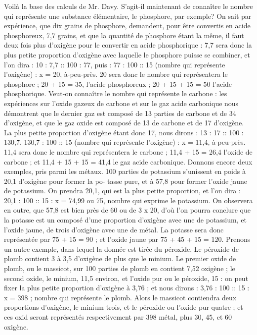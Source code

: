 Voilà la base des calculs de Mr. Davy. S'agit-il maintenant de connaître le nombre qui représente une substance élémentaire, le phosphore, par exemple? On sait par expérience, que dix grains de phosphore, demandent, pour être convertis en acide phosphoreux, 7,7 grains, et que la quantité de phosphore étant la même, il faut deux fois plus d'oxigène pour le convertir en acide\setcounter{page}{453} phosphorique : 7,7 sera donc la plus petite proportion d'oxigène avec laquelle le phosphore puisse se combiner, et l'on dira : 10 : 7,7 :: 100 : 77, puis : 77 : 100 :: 15 (nombre qui représente l'oxigène) : x = 20, à-peu-près. 20 sera donc le nombre qui représentera le phosphore ; 20 + 15 = 35, l'acide phosphoreux ; 20 + 15 + 15 = 50 l'acide phosphorique. Veut-on connaître le nombre qui représente le carbone : les expériences sur l'oxide gazeux de carbone et sur le gaz acide carbonique nous démontrent que le dernier gaz est composé de 13 parties de carbone et de 34 d'oxigène, et que le gaz oxide est composé de 13 de carbone et de 17 d'oxigène. La plus petite proportion d'oxigène étant donc 17, nous dirons : 13 : 17 :: 100 : 130,7. 130,7 : 100 :: 15 (nombre qui représente l'oxigène) : x = 11,4, à-peu-près. 11,4 sera donc le nombre qui représentera le carbone ; 11,4 + 15 = 26,4 l'oxide de carbone ; et 11,4 + 15 + 15 = 41,4 le gaz acide carbonique. Donnons encore deux exemples, pris parmi les métaux. 100 parties de potassium s'unissent en poids à 20,1 d'oxigène pour former la po-\setcounter{page}{454} tasse pure, et à 57,8 pour former l'oxide jaune de potassium. On prendra 20,1, qui est la plus petite proportion, et l'on dira : 20,1 : 100 :: 15 : x = 74,99 ou 75, nombre qui exprime le potassium. On observera en outre, que 57,8 est bien près de 60 ou de 3 x 20, d'où l'on pourra conclure que la potasse est un composé d'une proportion d'oxigène avec une de potassium, et l'oxide jaune, de trois d'oxigène avec une de métal. La potasse sera donc représentée par 75 + 15 = 90 ; et l'oxide jaune par 75 + 45 + 15 = 120. Prenons un autre exemple, dans lequel la donnée est tirée du péroxide. Le péroxide de plomb contient 3 à 3,5 d'oxigène de plus que le minium. Le premier oxide de plomb, ou le massicot, sur 100 parties de plomb en contient 7,52 oxigène ; le second oxide, le minium, 11,5 environ, et l'oxide pur ou le péroxide, 15 : on peut fixer la plus petite proportion d'oxigène à 3,76 ; et nous dirons : 3,76 : 100 :: 15 : x = 398 ; nombre qui représente le plomb. Alors le massicot contiendra deux proportions d'oxigène, le minium trois, et le péroxide ou l'oxide pur quatre ; et ces oxid seront représentés respectivement par 398 métal, plus 30, 45, et 60 oxigène.